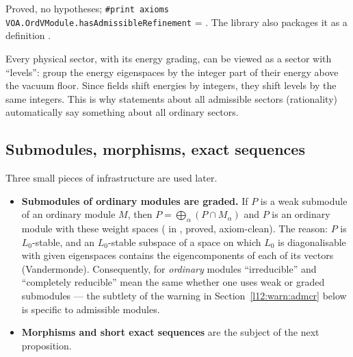 \begin{status}
Proved, no hypotheses; \texttt{\#print axioms VOA.OrdVModule.hasAdmissibleRefinement} =
. The library also packages it as a definition
.
\end{status}

\begin{physics}
Every physical sector, with its energy grading, can be viewed as a sector with ``levels'': group the energy
eigenspaces by the integer part of their energy above the vacuum floor. Since fields shift energies by integers,
they shift levels by the same integers. This is why statements about all admissible sectors (rationality)
automatically say something about all ordinary sectors.
\end{physics}

\subsection{Submodules, morphisms, exact sequences}

Three small pieces of infrastructure are used later.
\begin{itemize}
\item \textbf{Submodules of ordinary modules are graded.} If $P$ is a weak submodule of an ordinary module
  $M$, then $P = \bigoplus_\alpha(P\cap M_\alpha)$ and $P$ is an ordinary module with these weight spaces
  ( in , proved,
  axiom-clean). The reason: $P$ is $L_0$-stable, and an $L_0$-stable subspace of a space on which $L_0$
  is diagonalisable with given eigenspaces contains the eigencomponents of each of its vectors (Vandermonde).
  Consequently, for \emph{ordinary} modules ``irreducible'' and ``completely reducible'' mean the same
  whether one uses weak or graded submodules --- the subtlety of the warning in Section~\ref{l12:warn:admcr} below is
  specific to admissible modules.
\item \textbf{Morphisms and short exact sequences} are the subject of the next proposition.
\end{itemize}

